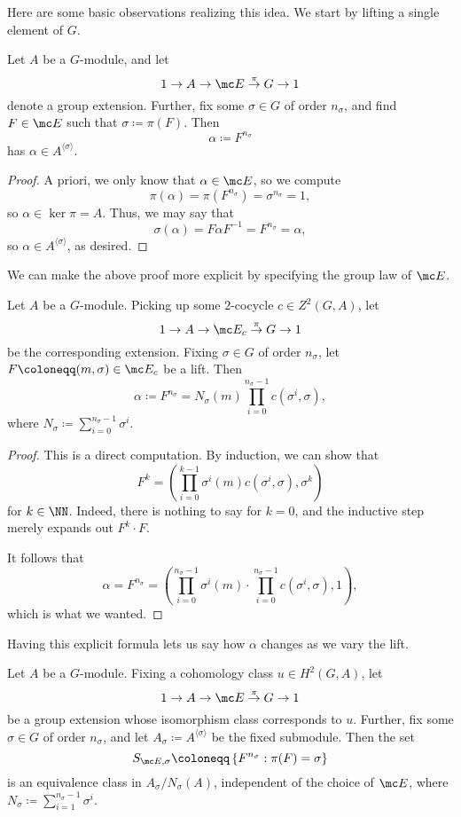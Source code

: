Here are some basic observations realizing this idea. We start by lifting a single element of $ G$.
\begin{lemma} \label{lem:constructalpha}
	Let $A$ be a $ G$-module, and let 
	\[1\to A\to\mc E\stackrel\pi\to G\to1\]
	denote a group extension. Further, fix some $\sigma\in G$ of order $n_\sigma$, and find $F\in\mc E$ such that $\sigma\coloneqq\pi(F)$. Then
	\[\alpha\coloneqq F^{n_\sigma}\]
	has $\alpha\in A^{\langle\sigma\rangle}$.
\end{lemma}
\begin{proof}
	A priori, we only know that $\alpha\in\mc E$, so we compute
	\[\pi(\alpha)=\pi\left(F^{n_\sigma}\right)=\sigma^{n_\sigma}=1,\]
	so $\alpha\in\ker\pi=A$. Thus, we may say that
	\[\sigma(\alpha)=F\alpha F^{-1}=F^{n_\sigma}=\alpha,\]
	so $\alpha\in A^{\langle\sigma\rangle}$, as desired.
\end{proof}
We can make the above proof more explicit by specifying the group law of $\mc E$.
\begin{lemma} \label{lem:explicitalpha}
	Let $A$ be a $ G$-module. Picking up some $2$-cocycle $c\in Z^2( G,A)$, let
	\[1\to A\to\mc E_c\stackrel\pi\to G\to1\]
	be the corresponding extension. Fixing $\sigma\in G$ of order $n_\sigma$, let $F\coloneqq(m,\sigma)\in\mc E_c$ be a lift. Then
	\[\alpha\coloneqq F^{n_\sigma}=N_\sigma(m)\prod_{i=0}^{n_\sigma-1}c\left(\sigma^i,\sigma\right),\]
	where $N_\sigma\coloneqq\sum_{i=0}^{n_\sigma-1}\sigma^i$.
\end{lemma}
\begin{proof}
	This is a direct computation. By induction, we can show that
	\[F^k=\left(\prod_{i=0}^{k-1}\sigma^i(m)c\left(\sigma^i,\sigma\right),\sigma^k\right)\]
	for $k\in\NN$. Indeed, there is nothing to say for $k=0$, and the inductive step merely expands out $F^k\cdot F$.

	It follows that
	\[\alpha=F^{n_\sigma}=\left(\prod_{i=0}^{n_\sigma-1}\sigma^i(m)\cdot\prod_{i=0}^{n_\sigma-1}c\left(\sigma^i,\sigma\right),1\right),\]
	which is what we wanted.
\end{proof}
Having this explicit formula lets us say how $\alpha$ changes as we vary the lift.
\begin{prop} \label{prop:findallalpha}
	Let $A$ be a $ G$-module. Fixing a cohomology class $u\in H^2( G,A)$, let 
	\[1\to A\to\mc E\stackrel\pi\to G\to1\]
	be a group extension whose isomorphism class corresponds to $u$. Further, fix some $\sigma\in G$ of order $n_\sigma$, and let $A_\sigma\coloneqq A^{\langle\sigma\rangle}$ be the fixed submodule. Then the set
	\[S_{\mc E,\sigma}\coloneqq\left\{F^{n_\sigma}:\pi(F)=\sigma\right\}\]
	is an equivalence class in $A_\sigma/N_\sigma(A)$, independent of the choice of $\mc E$, where $N_\sigma\coloneqq\sum_{i=1}^{n_\sigma-1}\sigma^i$.
\end{prop}
